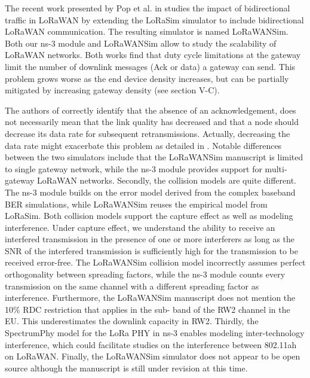 The recent work presented by Pop et al.
in \cite{pop_does_2017} studies the impact of bidirectional traffic in LoRaWAN by extending the LoRaSim simulator to include bidirectional LoRaWAN communication.
The resulting simulator is named LoRaWANSim.
Both our ns-3 module and LoRaWANSim allow to study the scalability of LoRaWAN networks.
Both works find that duty cycle limitations at the gateway limit the number of downlink messages (Ack or data) a gateway can send.
This problem grows worse as the end device density increases,
	but can be partially mitigated by increasing gateway density (see section V-C).

The authors of \cite{pop_does_2017} correctly identify that the absence of an acknowledgement,
	does not necessarily mean that the link quality has decreased and that a node should decrease its data rate for subsequent retransmissions.
Actually,
	decreasing the data rate might exacerbate this problem as detailed in \cite{pop_does_2017}.
Notable differences between the two simulators include that the LoRaWANSim manuscript is limited to single gateway network,
	while the ns-3 module provides support for multi-gateway LoRaWAN networks.
Secondly,
	the collision models are quite different.
The ns-3 module builds on the error model derived from the complex baseband BER simulations,
	while LoRaWANSim reuses the empirical model from LoRaSim.
Both collision models support the capture effect as well as modeling interference.
Under capture effect,
	we understand the ability to receive an interfered transmission in the presence of one or more interferers as long as the SNR of the interfered transmission is sufficiently high for the transmission to be received error-free.
The LoRaWANSim collision model incorrectly assumes perfect orthogonality between spreading factors,
	while the ns-3 module counts every transmission on the same channel with a different spreading factor as interference.
Furthermore,
	the LoRaWANSim manuscript does not mention the 10\% RDC restriction that applies in the sub-
band of the RW2 channel in the EU.
This underestimates the downlink capacity in RW2.
Thirdly,
	the SpectrumPhy model for the LoRa PHY in ns-3 enables modeling inter-technology interference,
	which could facilitate studies on the interference between 802.11ah on LoRaWAN.
Finally,
	the LoRaWANSim simulator does not appear to be open source although the manuscript is still under revision at this time.

